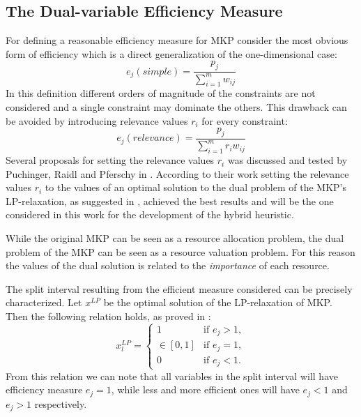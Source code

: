 \subsection{The Dual-variable Efficiency Measure}
\label{subsec:dual}
For defining a reasonable efficiency measure for MKP consider the most obvious
form of efficiency which is a direct generalization of the one-dimensional case:
\begin{displaymath}
	e_j(simple) = \frac{p_j}{\sum_{i=1}^{m} w_{ij}}
\end{displaymath}
In this definition different orders of magnitude of the constraints are not
considered and a single constraint may dominate the others.
This drawback can be avoided by introducing relevance values $r_i$ for every
constraint:
\begin{displaymath}
	e_j(relevance) = \frac{p_j}{\sum_{i=1}^{m} r_i w_{ij}}
\end{displaymath}
Several proposals for setting the relevance values $r_i$ was discussed and
tested by Puchinger, Raidl and Pferschy in \cite{puchinger2006core}.
According to their work setting the relevance values $r_i$ to the values of an
optimal solution to the dual problem of the MKP's LP-relaxation, as suggested
in \cite{Chu-Beasley-1998}, achieved the best results and will be the one
considered in this work for the development of the hybrid heuristic.

While the original MKP can be seen as a resource allocation problem,
the dual problem of the MKP can be seen as a resource valuation problem.
For this reason the values of the dual solution is related to the
\emph{importance} of each resource.

The split interval resulting from the efficient measure considered can be
precisely characterized.
Let $x^{LP}$ be the optimal solution of the LP-relaxation of MKP.
Then the following relation holds, as proved in \cite{puchinger2006core}:
\begin{displaymath}
 x_l^{LP} =
  \begin{cases}
    1         & \mbox{if } e_j > 1, \\
    \in [0,1] & \mbox{if } e_j = 1, \\
    0         & \mbox{if } e_j < 1.
  \end{cases}
\end{displaymath}
From this relation we can note that all variables in the split interval will
have efficiency measure $e_j = 1$, while less and more efficient ones will have
$e_j < 1$ and $e_j > 1$ respectively.

